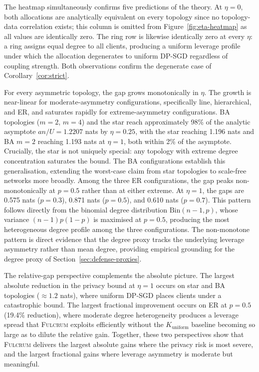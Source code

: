 \documentclass[letterpaper,journal]{IEEEtran}
\newcommand{\Fulcrum}{\textsc{Fulcrum}\xspace}
\begin{document}
The heatmap simultaneously confirms five predictions of the theory.
At $\eta = 0$, both allocations are analytically equivalent on every
topology since no topology-data correlation exists; this column is
omitted from Figure~\ref{fig:eta-heatmap} as all values are
identically zero. The ring row is likewise identically zero at every
$\eta$: a ring assigns equal degree to all clients, producing a
uniform leverage profile under which the allocation degenerates to
uniform DP-SGD regardless of coupling strength. Both observations
confirm the degenerate case of Corollary~\ref{cor:strict}.

For every asymmetric topology, the gap grows monotonically in
$\eta$. The growth is near-linear for moderate-asymmetry
configurations, specifically line, hierarchical, and ER, and
saturates rapidly for extreme-asymmetry configurations. BA
topologies ($m = 2$, $m = 4$) and the star reach approximately 98\%
of the analytic asymptote $an/U = 1.2207$ nats by $\eta = 0.25$,
with the star reaching 1.196 nats and BA $m = 2$ reaching 1.193
nats at $\eta = 1$, both within 2\% of the asymptote. Crucially,
the star is not uniquely special: any topology with extreme degree
concentration saturates the bound. The BA configurations establish
this generalisation, extending the worst-case claim from star
topologies to scale-free networks more broadly. Among the three ER configurations, the gap peaks non-monotonically
at $p = 0.5$ rather than at either extreme. At $\eta = 1$, the gaps
are 0.575 nats ($p = 0.3$), 0.871 nats ($p = 0.5$), and 0.610 nats
($p = 0.7$). This pattern follows directly from the binomial degree
distribution $\mathrm{Bin}(n-1, p)$, whose variance
$(n-1)p(1-p)$ is maximised at $p = 0.5$, producing the most
heterogeneous degree profile among the three configurations. The
non-monotone pattern is direct evidence that the degree proxy tracks
the underlying leverage asymmetry rather than mean degree, providing
empirical grounding for the degree proxy of
Section~\ref{sec:defense-proxies}.

The relative-gap perspective complements the absolute picture. The
largest absolute reduction in the privacy bound at $\eta = 1$
occurs on star and BA topologies ($\approx 1.2$ nats), where
uniform DP-SGD places clients under a catastrophic bound. The
largest fractional improvement occurs on ER at $p = 0.5$ (19.4\%
reduction), where moderate degree heterogeneity produces a leverage
spread that \Fulcrum exploits efficiently without the
$K_{\mathrm{uniform}}$ baseline becoming so large as to dilute the
relative gain. Together, these two perspectives show that \Fulcrum
delivers the largest absolute gains where the privacy risk is most
severe, and the largest fractional gains where leverage asymmetry is
moderate but meaningful.
\end{document}
